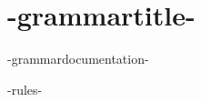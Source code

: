 \documentclass{article}
\begin{document}
\section*{-grammartitle-}
-grammardocumentation-

-rules-
\end{document}

